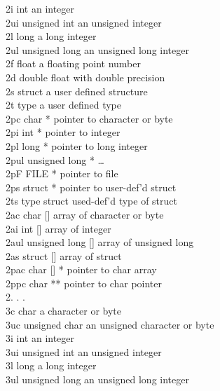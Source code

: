\begin{mylist}
2i        int                     an integer\\
2ui       unsigned int            an unsigned integer\\
2l        long                    a long integer\\
2ul       unsigned long           an unsigned long integer\\
2f        float                   a floating point number\\
2d        double          float with double precision\\
2s        struct          a user defined structure\\
2t        type                    a user defined type\\
2pc       char *          pointer to character or byte\\
2pi       int *                   pointer to integer\\
2pl       long *          pointer to long integer\\
2pul      unsigned long *         \dots\\
2pF       FILE *          pointer to file\\
2ps       struct *                pointer to user-def'd struct\\
2ts       type struct             used-def'd type of struct\\
2ac       char []                 array of character or byte\\
2ai       int []          array of integer\\
2aul      unsigned long []        array of unsigned long\\
2as       struct []               array of struct\\
2pac      char [] *               pointer to char array\\
2ppc      char **                 pointer to char pointer\\
2.          .                     . \\
3c        char                    a character or byte\\
3uc       unsigned char           an unsigned character or byte\\
3i        int                     an integer\\
3ui       unsigned int            an unsigned integer\\
3l        long                    a long integer\\
3ul       unsigned long           an unsigned long integer\\

\end{mylist}
